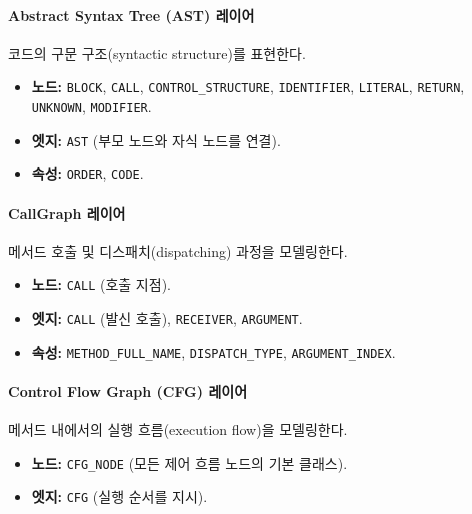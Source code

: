 \paragraph{Abstract Syntax Tree (AST) 레이어} 코드의 구문 구조(syntactic structure)를 표현한다.
\begin{itemize} \setlength{\itemsep}{0pt} \setlength{\parskip}{0pt} \setlength{\topsep}{0pt} \setlength{\partopsep}{0pt}
    \item \textbf{노드:} \texttt{BLOCK}, \texttt{CALL}, \texttt{CONTROL\_STRUCTURE}, \texttt{IDENTIFIER}, \texttt{LITERAL}, \texttt{RETURN}, \texttt{UNKNOWN}, \texttt{MODIFIER}.
    \item \textbf{엣지:} \texttt{AST} (부모 노드와 자식 노드를 연결).
    \item \textbf{속성:} \texttt{ORDER}, \texttt{CODE}.
\end{itemize}

\paragraph{CallGraph 레이어} 메서드 호출 및 디스패치(dispatching) 과정을 모델링한다.
\begin{itemize} \setlength{\itemsep}{0pt} \setlength{\parskip}{0pt} \setlength{\topsep}{0pt} \setlength{\partopsep}{0pt}
    \item \textbf{노드:} \texttt{CALL} (호출 지점).
    \item \textbf{엣지:} \texttt{CALL} (발신 호출), \texttt{RECEIVER}, \texttt{ARGUMENT}.
    \item \textbf{속성:} \texttt{METHOD\_FULL\_NAME}, \texttt{DISPATCH\_TYPE}, \texttt{ARGUMENT\_INDEX}.
\end{itemize}

\paragraph{Control Flow Graph (CFG) 레이어} 메서드 내에서의 실행 흐름(execution flow)을 모델링한다.
\begin{itemize} \setlength{\itemsep}{0pt} \setlength{\parskip}{0pt} \setlength{\topsep}{0pt} \setlength{\partopsep}{0pt}
    \item \textbf{노드:} \texttt{CFG\_NODE} (모든 제어 흐름 노드의 기본 클래스).
    \item \textbf{엣지:} \texttt{CFG} (실행 순서를 지시).
\end{itemize}

